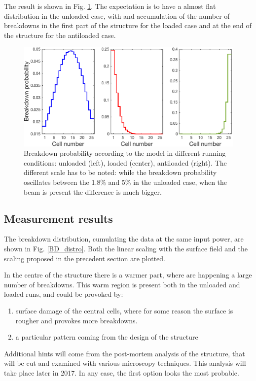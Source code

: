 The result is shown in Fig. \ref{BD_prob}. The expectation is to have a almost flat distribution in the unloaded case, with and accumulation of the number of breakdowns in the first part of the structure for the loaded case and at the end of the structure for the antiloaded case.


\begin{figure}[h]
\centering 
\includegraphics[scale=0.45]{pictures/BD_probability.png}
\caption{Breakdown probability according to the model in different running conditions: unloaded (left), loaded (center), antiloaded (right). The different scale has to be noted: while the breakdown probability oscillates between the 1.8\% and 5\% in the unloaded case, when the beam is present the difference is much bigger.}
\label{BD_prob}
\end{figure}


\subsection[Measurement results]{Measurement results}

The breakdown distribution, cumulating the data at the same input power, are shown in Fig. \ref{BD_distro}. Both the linear scaling with the surface field and the scaling proposed in the precedent section are plotted.

In the centre of the structure there is a warmer part, where are happening a large number of breakdowns. This warm region is present both in the unloaded and loaded runs, and could be provoked by: 
\begin{enumerate}
\item surface damage of the central cells, where for some reason the surface is rougher and provokes more breakdowns. 
\item a particular pattern coming from the design of the structure
\end{enumerate}
Additional hints will come from the post-mortem analysis of the structure, that will be cut and examined with various microscopy techniques. This analysis will take place later in 2017. In any case, the first option looks the most probable. 

